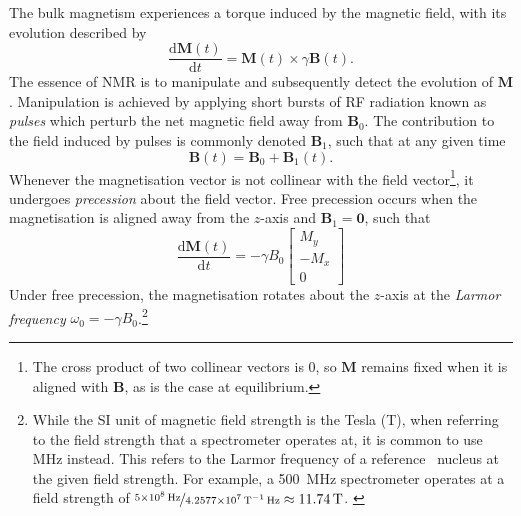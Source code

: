 The bulk magnetism experiences a torque induced by the magnetic field, with its
evolution described by
\begin{equation}
  \frac{\mathrm{d}\symbf{M}(t)}{\mathrm{d}t} = \symbf{M}(t) \times \gamma \symbf{B}(t).
  \label{eq:M-cross-B}
\end{equation}
The essence of \ac{NMR} is to manipulate and subsequently detect the evolution
of $\symbf{M}$. Manipulation is achieved by applying short bursts of \ac{RF}
radiation known as \emph{pulses} which perturb the net magnetic field away from
$\symbf{B}_0$. The contribution to the field induced by pulses is commonly
denoted $\symbf{B}_1$, such that at any given time
\begin{equation}
    \symbf{B}(t) = \symbf{B}_0 + \symbf{B}_1(t).
\end{equation}
Whenever the magnetisation vector is not collinear with the field vector\footnote{
    The cross product of two collinear vectors is $0$, so $\symbf{M}$ remains
    fixed when it is aligned with $\symbf{B}$, as is the case at equilibrium.
}, it
undergoes \emph{precession} about the field vector. Free precession occurs
when the magnetisation is aligned away from the $z$-axis and $\symbf{B}_1 =
\symbf{0}$, such that
\begin{equation}
  \frac{\mathrm{d}\symbf{M}(t)}{\mathrm{d}t} =
  -\gamma B_0
  \begin{bmatrix}
      M_y \\ -M_x \\ 0
  \end{bmatrix}
\end{equation}
Under free precession, the magnetisation rotates about the $z$-axis at the
\emph{Larmor frequency} $\omega_0 = -\gamma B_0$.\footnote{
    While the \ac{SI} unit of magnetic field strength is the Tesla
    (\unit{\tesla}), when referring to the field strength that a spectrometer
    operates at, it is common to use \unit{\mega\hertz} instead. This refers to
    the Larmor frequency of a reference \proton\ nucleus at the
    given field strength. For example, a \qty{500}{\mega\hertz} spectrometer
    operates at a field strength of
    $\nicefrac{\qty{5e8}{\hertz}}{\qty{4.2577e7}{\per\tesla\hertz}}
    \approx \qty{11.74}{\tesla}$.
    \label{fn:MHz}
}

